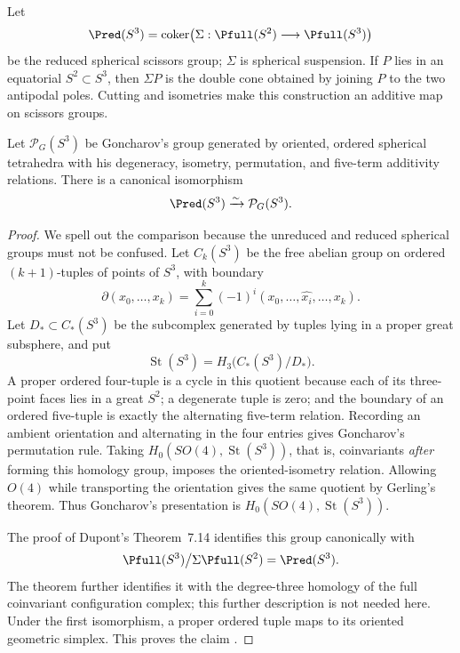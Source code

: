 Let
\[
 \Pred(S^3)=\operatorname{coker}
 \bigl(\Sigma:\Pfull(S^2)\longrightarrow\Pfull(S^3)\bigr)
\]
be the reduced spherical scissors group; \(\Sigma\) is spherical
suspension.  If \(P\) lies in an equatorial \(S^2\subset S^3\), then
\(\Sigma P\) is the double cone obtained by joining \(P\) to the two
antipodal poles.  Cutting and isometries make this construction an additive
map on scissors groups.

\begin{lemma}
\label{cp:lem-spherical-presentations}
Let \(\mathcal P_G(S^3)\) be Goncharov's group generated by oriented,
ordered spherical tetrahedra with his degeneracy, isometry, permutation,
and five-term additivity relations.  There is a canonical isomorphism
\[
 \Pred(S^3)\xrightarrow{\sim}\mathcal P_G(S^3).
\]
\end{lemma}

\begin{proof}
We spell out the comparison because the unreduced and reduced spherical
groups must not be confused.  Let \(C_k(S^3)\) be the free abelian group on
ordered \((k+1)\)-tuples of points of \(S^3\), with boundary
\[
 \partial(x_0,\ldots,x_k)=
 \sum_{i=0}^k(-1)^i(x_0,\ldots,\widehat{x_i},\ldots,x_k).
\]
Let \(D_*\subset C_*(S^3)\) be the subcomplex generated by tuples lying in
a proper great subsphere, and put
\[
 \operatorname{St}(S^3)=H_3\bigl(C_*(S^3)/D_*\bigr).
\]
A proper ordered four-tuple is a cycle in this quotient because each of its
three-point faces lies in a great \(S^2\); a degenerate tuple is zero; and
the boundary of an ordered five-tuple is exactly the alternating five-term
relation.  Recording an ambient orientation and alternating in the four
entries gives Goncharov's permutation rule.  Taking
\(H_0(SO(4),\operatorname{St}(S^3))\), that is, coinvariants \emph{after}
forming this homology group, imposes the oriented-isometry relation.
Allowing \(O(4)\) while transporting the orientation gives the same quotient
by Gerling's theorem.  Thus Goncharov's presentation is
\(H_0(SO(4),\operatorname{St}(S^3))\).

The proof of Dupont's Theorem~7.14 identifies this group canonically with
\[
 \Pfull(S^3)\big/\Sigma\Pfull(S^2)=\Pred(S^3).
\]
The theorem further identifies it with the degree-three homology of the
full coinvariant configuration complex; this further description is not
needed here.  Under the first isomorphism, a proper ordered tuple maps to
its oriented geometric simplex.  This proves the claim
\cite[Theorem~7.14]{Dupont2001}
\cite[Chapter~2, Section~1]{Goncharov1999}.
\end{proof}

